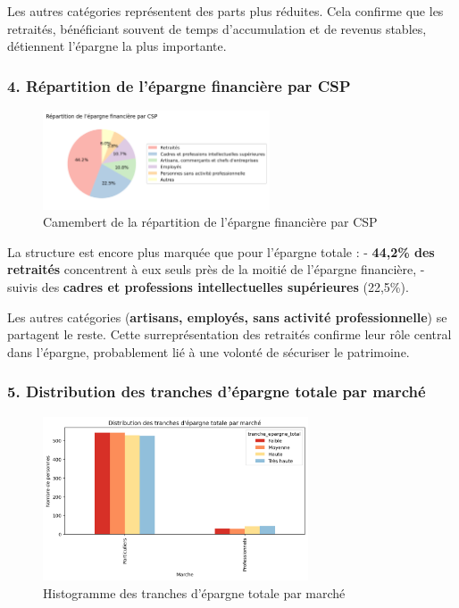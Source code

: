 Les autres catégories représentent des parts plus réduites.  
Cela confirme que les retraités, bénéficiant souvent de temps d’accumulation et de revenus stables, détiennent l'épargne la plus importante.

\subsubsection*{4. Répartition de l'épargne financière par CSP}
\begin{figure}[h]
    \centering
    \includegraphics[width=0.6\textwidth]{images/py/csp_epargne_fin.png}
    \caption{Camembert de la répartition de l'épargne financière par CSP}
\end{figure}

La structure est encore plus marquée que pour l'épargne totale :  
- \textbf{44,2\% des retraités} concentrent à eux seuls près de la moitié de l'épargne financière,  
- suivis des \textbf{cadres et professions intellectuelles supérieures} (22,5\%).  

Les autres catégories (\textbf{artisans, employés, sans activité professionnelle}) se partagent le reste.  
Cette surreprésentation des retraités confirme leur rôle central dans l'épargne, probablement lié à une volonté de sécuriser le patrimoine.

\subsubsection*{5. Distribution des tranches d'épargne totale par marché}
\begin{figure}[!h]
    \centering
    \includegraphics[width=0.7\textwidth]{images/py/epargne_total_marche.png}
    \caption{Histogramme des tranches d'épargne totale par marché}
\end{figure}

